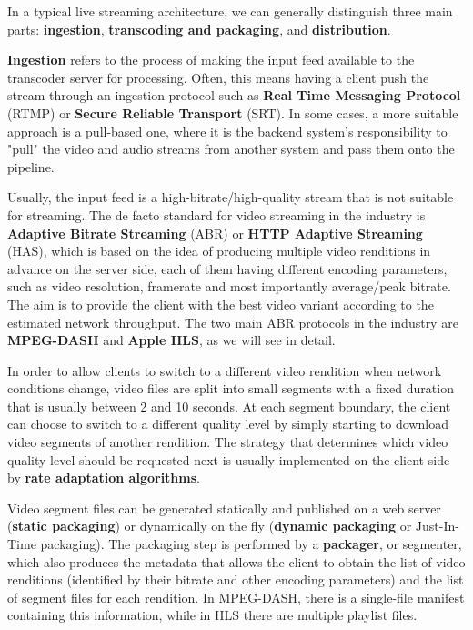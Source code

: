 In a typical live streaming architecture, we can generally distinguish three main parts: \textbf{ingestion}, \textbf{transcoding and packaging}, and \textbf{distribution}.

\textbf{Ingestion} refers to the process of making the input feed available to the transcoder server for processing. Often, this means having a client push the stream through an ingestion protocol such as \textbf{Real Time Messaging Protocol} (RTMP) or \textbf{Secure Reliable Transport} (SRT). In some cases, a more suitable approach is a pull-based one, where it is the backend system's responsibility to "pull" the video and audio streams from another system and pass them onto the pipeline.

Usually, the input feed is a high-bitrate/high-quality stream that is not suitable for streaming. The de facto standard for video streaming in the industry is \textbf{Adaptive Bitrate Streaming} (ABR) or \textbf{HTTP Adaptive Streaming} (HAS), which is based on the idea of producing multiple video renditions in advance on the server side, each of them having different encoding parameters, such as video resolution, framerate and most importantly average/peak bitrate. The aim is to provide the client with the best video variant according to the estimated network throughput. The two main ABR protocols in the industry are \textbf{MPEG-DASH} and \textbf{Apple HLS}, as we will see in detail.

In order to allow clients to switch to a different video rendition when network conditions change, video files are split into small segments with a fixed duration that is usually between 2 and 10 seconds. At each segment boundary, the client can choose to switch to a different quality level by simply starting to download video segments of another rendition. The strategy that determines which video quality level should be requested next is usually implemented on the client side by \textbf{rate adaptation algorithms}.

Video segment files can be generated statically and published on a web server (\textbf{static packaging}) or dynamically on the fly (\textbf{dynamic packaging} or Just-In-Time packaging). The packaging step is performed by a \textbf{packager}, or segmenter, which also produces the metadata that allows the client to obtain the list of video renditions (identified by their bitrate and other encoding parameters) and the list of segment files for each rendition. In MPEG-DASH, there is a single-file manifest containing this information, while in HLS there are multiple playlist files.

